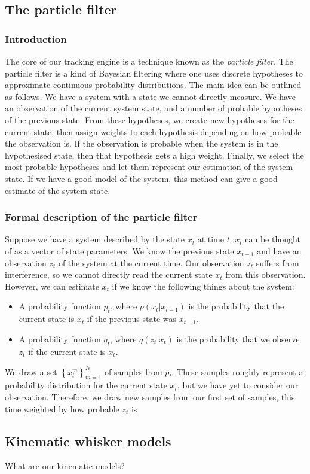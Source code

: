 \subsection{The particle filter}
\subsubsection{Introduction}
The core of our tracking engine is a technique known as the \emph{particle filter}. The particle filter is a kind of Bayesian filtering where one uses discrete hypotheses to approximate continuous probability distributions. The main idea can be outlined as follows. We have a system with a state we cannot directly measure. We have an observation of the current system state, and a number of probable hypotheses of the previous state. From these hypotheses, we create new hypotheses for the current state, then assign weights to each hypothesis depending on how probable the observation is. If the observation is probable when the system is in the hypothesised state, then that hypothesis gets a high weight. Finally, we select the most probable hypotheses and let them represent our estimation of the system state. If we have a good model of the system, this method can give a good estimate of the system state.



\subsubsection{Formal description of the particle filter}
Suppose we have a system described by the state $x_t$ at time $t$. $x_t$ can be thought of as a vector of state parameters. We know the previous state $x_{t-1}$ and have an observation $z_t$ of the system at the current time. Our observation $z_t$ suffers from interference, so we cannot directly read the current state $x_t$ from this observation. However, we can estimate $x_t$ if we know the following things about the system:

\begin{itemize}
\item A probability function $p_t$, where $p\left(x_t | x_{t-1}\right)$ is the probability that the current state is $x_t$ if the previous state was $x_{t-1}$.
\item A probability function $q_t$, where $q\left(z_t | x_t\right)$ is the probability that we observe $z_t$ if the current state is $x_t$.
\end{itemize}

We draw a set $\left\{x_t^m\right\}_{m=1}^{N}$ of samples from $p_t$. These samples roughly represent a probability distribution for the current state $x_t$, but we have yet to consider our observation. Therefore, we draw new samples from our first set of samples, this time weighted by how probable $z_t$ is 

\subsection{Kinematic whisker models}
What are our kinematic models?
